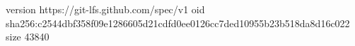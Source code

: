 version https://git-lfs.github.com/spec/v1
oid sha256:c2544dbf358f09e1286605d21cdfd0ee0126cc7ded10955b23b518da8d16c022
size 43840
